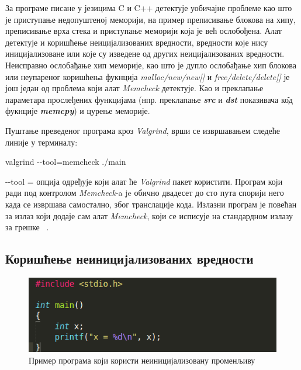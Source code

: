\documentclass[12pt,oneside]{memoir}
\begin{document}
\indent За програме писане у језицима C и C++ детектује уобичајне проблеме као што је приступање недопуштеној меморији, на пример преписивање блокова на хипу, преписивање врха стека и приступање меморији која је већ ослобођена. Алат детектује и коришћење неицијализованих вредности, вредности које нису иницијализоване или које су изведене од других неицијализованих вредности. Неисправно ослобађање хип меморије, као што је дупло ослобађање хип блокова или неупареног коришћења фукнција \textit{malloc/new/new[]} и \textit{free/delete/delete[]} је још један од проблема који алат \textit{Memcheck} детектује. Као и преклапање параметара прослеђених функцијама (нпр. преклапање \textbf{\textit{src}} и \textbf{\textit{dst}} показивача к\^{о}д фукнције \textbf{\textit{memcpy}}) и цурење меморије.

\indent Пуштање преведеног програма кроз \textit{Valgrind}, врши се извршавањем следеће линије у терминалу:

\begin{center}
 valgrind -\--tool=memcheck ./main
\end{center}

\indent -\--tool = опција одређује који алат ће \textit{Valgrind} пакет користити. Програм који ради под контролом \textit{Memcheck}-a je обично двадесет до сто пута спорији него када се извршава самостално, због транслације кода. Излазни програм је повећан за излаз који додаје сам алат \textit{Memcheck}, који се исписује на стандардном излазу за грешке ~\cite{memcheckRef}.



\subsection{Коришћење неиницијализованих вредности}

\begin{figure}[h!]
\begin{center}
\includegraphics[scale=0.75]{slika1.png}
\end{center}
\caption{Пример програма који користи неиницијализовану променљиву}
\label{fig:main}
\end{figure}
\end{document}
